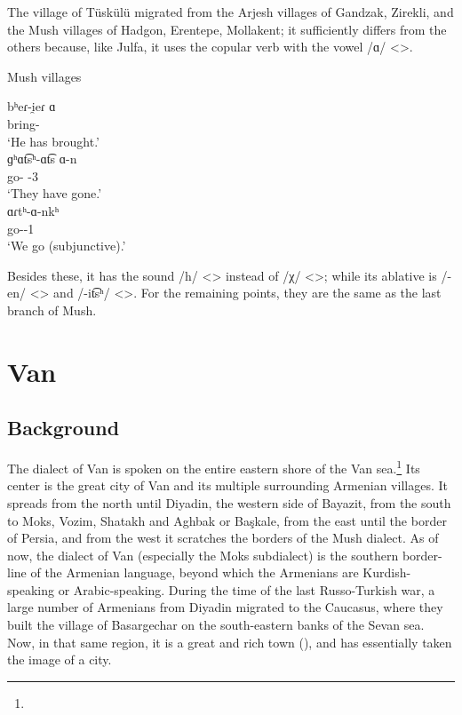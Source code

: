 The village of Tüskülü migrated from the Arjesh villages of Gandzak, Zirekli, and the Mush villages of Hadgon, Erentepe, Mollakent; it sufficiently differs from the others because, like Julfa, it uses the copular verb with the vowel /ɑ/ <>.

\begin{exe}
	\ex Mush villages \label{sent:Mush:textSample:village:Aux}
	\begin{xlist}
		\ex \gll bʰeɾ-i̯eɾ ɑ \\
		bring-{\perfcvb} {\aux} \\
		\trans `He has brought.'\\
		\ex \gll ɡʰɑt͡sʰ-ɑt͡s ɑ-n \\
		go-{\rptcp} {\aux}-3{\pl} \\
		\trans `They have gone.'\\
		\ex \gll ɑɾtʰ-ɑ-nkʰ \\
		go-{\thgloss}-1{\pl} \\
		\trans `We go (subjunctive).'\\
		
	\end{xlist}
\end{exe}


Besides these, it has the sound /h/ <> instead of /χ/ <>; while its ablative is /-en/ <> and /-it͡sʰ/ <>. For the remaining points, they are the same as the last branch of Mush. 




\chapter{Van}\label{chapter:Van}

\section{Background}

\begin{adjarianpage}\label{page:140}\end{adjarianpage}%

The dialect of Van is spoken on the entire eastern shore of the Van sea.\footnote{} Its center is the great city of Van and its multiple surrounding Armenian villages. It spreads from the north until Diyadin, the western side of Bayazit, from the south to Moks, Vozim, Shatakh and Aghbak or Başkale, from the east until the border of Persia, and from the west it scratches the borders of the Mush dialect. As of now, the dialect of Van (especially the Moks subdialect) is the southern border-line of the Armenian language, beyond which the Armenians are Kurdish-speaking or Arabic-speaking. During the time of the last Russo-Turkish war, a large number of Armenians from Diyadin migrated to the Caucasus, where they built the village of Basargechar on the south-eastern banks of the Sevan sea. Now, in that same region, it is a great and rich town (), and has essentially taken the image of a city. 

